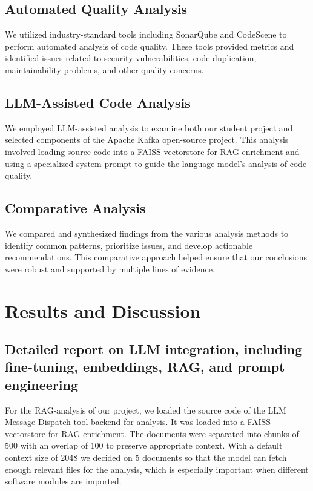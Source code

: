 \documentclass[sigconf]{acmart}
\begin{document}
\subsection{Automated Quality Analysis}
We utilized industry-standard tools including SonarQube and CodeScene to perform automated analysis of code quality. These tools provided metrics and identified issues related to security vulnerabilities, code duplication, maintainability problems, and other quality concerns.

\subsection{LLM-Assisted Code Analysis}
We employed LLM-assisted analysis to examine both our student project and selected components of the Apache Kafka open-source project. This analysis involved loading source code into a FAISS vectorstore for RAG enrichment and using a specialized system prompt to guide the language model's analysis of code quality.

\subsection{Comparative Analysis}
We compared and synthesized findings from the various analysis methods to identify common patterns, prioritize issues, and develop actionable recommendations. This comparative approach helped ensure that our conclusions were robust and supported by multiple lines of evidence.

\section{Results and Discussion}

\subsection{Detailed report on LLM integration, including fine-tuning, embeddings, RAG, and prompt engineering}
For the RAG-analysis of our project, we loaded the source code of the LLM Message Dispatch tool backend for analysis. It was loaded into a FAISS vectorstore for RAG-enrichment. The documents were separated into chunks of 500 with an overlap of 100 to preserve appropriate context. With a default context size of 2048 we decided on 5 documents so that the model can fetch enough relevant files for the analysis, which is especially important when different software modules are imported.
\end{document}
